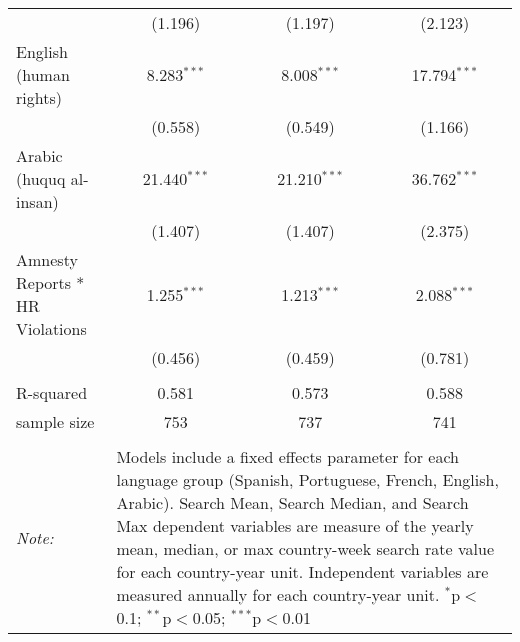 \begin{table}[!htbp]
\begin{tabular}{@{\extracolsep{5pt}}lccc}
  & (1.196) & (1.197) & (2.123) \\ 
  English (human rights) & 8.283$^{***}$ & 8.008$^{***}$ & 17.794$^{***}$ \\ 
  & (0.558) & (0.549) & (1.166) \\ 
  Arabic (huquq al-insan) & 21.440$^{***}$ & 21.210$^{***}$ & 36.762$^{***}$ \\ 
  & (1.407) & (1.407) & (2.375) \\ 
  Amnesty Reports * HR Violations & 1.255$^{***}$ & 1.213$^{***}$ & 2.088$^{***}$ \\ 
  & (0.456) & (0.459) & (0.781) \\ 
 \hline \\[-1.8ex] 
R-squared  & 0.581 & 0.573 & 0.588 \\ 
sample size  & 753 & 737 & 741 \\ 
\hline 
\hline \\[-1.8ex] 
\textit{Note:}  & \multicolumn{3}{l}{\parbox[t]{8cm}{Models include a fixed effects parameter for each language group (Spanish, Portuguese, French, English, Arabic). Search Mean, Search Median, and Search Max dependent variables are measure of the yearly mean, median, or max country-week search rate value for each country-year unit. Independent variables are measured annually for each country-year unit. $^{*}$p$<$0.1; $^{**}$p$<$0.05; $^{***}$p$<$0.01}} \\ 
\end{tabular} 
\end{table} 
